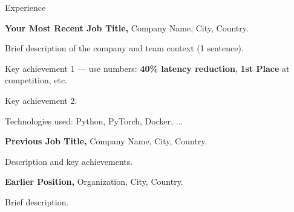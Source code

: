 \begin{rubric}{Experience}

%
    \textbf{Your Most Recent Job Title,} Company Name, City, Country.
    \par Brief description of the company and team context (1 sentence).
    \par Key achievement 1 — use numbers: \textbf{40\% latency reduction}, \textbf{1st Place} at competition, etc.
    \par Key achievement 2.
    \par Technologies used: Python, PyTorch, Docker, ...

%
    \textbf{Previous Job Title,} Company Name, City, Country.
    \par Description and key achievements.

\entry*[YEAR]%
    \textbf{Earlier Position,} Organization, City, Country.
    \par Brief description.


\end{rubric}
